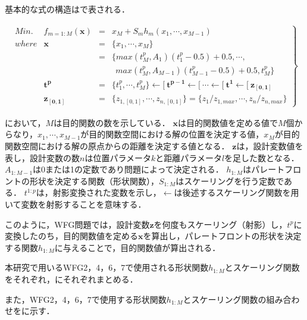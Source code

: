 \documentclass[../main/main]{subfiles}
\begin{document}
基本的な式の構造はで表される．

\begin{eqnarray} 
\left.
\begin{array}{rccl}
Min. & f_{m = 1:M}  (\bm{x}) &=& x_M + S_m h_m (x_1, \cdots, x_{M-1})\\
where & \bm{x} &=& \{x_1, \cdots, x_M\} \\
&&=& \{ max(t^p_M,A_1)(t^p_1 - 0.5) + 0.5, \cdots, \\
& & & \ \ max(t^p_M,A_{M-1})(t^p_{M-1} - 0.5)+0.5, t^p_M\} \\
& \bm{t^p} &=& \{t^p_1, \cdots, t^p_M \} \longleftarrow [ \ \bm{t^{p-1}} \longleftarrow [ \ \cdots \longleftarrow [ \ \bm{t^1} \longleftarrow [ \ \bm{z_{[0,1]}}\\
&  \bm{z_{[0,1]}} &=& \{ z_{1,[0,1]}, \cdots, z_{n,[0,1]} \} = \{ z_1 / z_{1,max}, \cdots, z_n / z_{n,max} \}
   \label{wfg_standard} 
\end{array}
\right\}
\end{eqnarray}

において，$M$は目的関数の数を示している．
$\bm{x}$は目的関数値を定める値で$M$個からなり，$x_1, \cdots, x_{M-1}$が目的関数空間における解の位置を決定する値，$x_M$が目的関数空間における解の原点からの距離を決定する値となる．
$\bm{z}$は，設計変数値を表し，設計変数の数$n$は位置パラメータ$k$と距離パラメータ$l$を足した数となる．
$A_{1:M-1}$は0または1の定数であり問題によって決定される．
$h_{1:M}$はパレートフロントの形状を決定する関数（形状関数），$S_{1:M}$はスケーリングを行う定数である．
$t^{1:p}$は，射影変換された変数を示し，$\longleftarrow$は後述するスケーリング関数を用いて変数を射影することを意味する．

このように，WFG問題では，設計変数$\bm{z}$を何度もスケーリング（射影）し，$t^p$に変換したのち，目的関数値を定める$\bm{x}$を算出し，パレートフロントの形状を決定する関数$h_{1:M}$に与えることで，目的関数値が算出される．

本研究で用いるWFG2，4，6，7で使用される形状関数$h_{1:M}$とスケーリング関数をそれぞれ，にそれぞれまとめる．

また，WFG2，4，6，7で使用する形状関数$h_{1:M}$とスケーリング関数の組み合わせをに示す．
\end{document}
